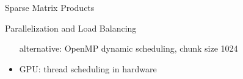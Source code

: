 \begin{frame}[fragile]{Sparse Matrix Products}
\begin{block}{Parallelization and Load Balancing}
\begin{itemize}
alternative: OpenMP dynamic scheduling, chunk size 1024
   \item GPU: thread scheduling in hardware
  \end{itemize}
 \end{block}


\end{frame}

